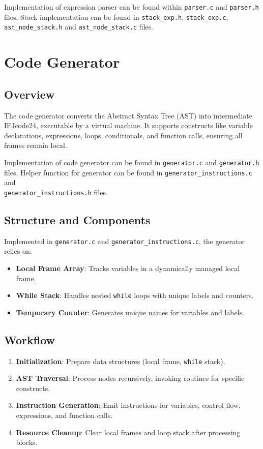 \documentclass[12pt,a4paper]{article}
\begin{document}
Implementation of expression parser can be found within \texttt{parser.c} and \texttt{parser.h} files. Stack implementation can be found in \texttt{stack\_exp.h}, \texttt{stack\_exp.c}, \texttt{ast\_node\_stack.h} and \texttt{ast\_node\_stack.c} files.

\newpage
\section{Code Generator}

\subsection{Overview}
The code generator converts the Abstract Syntax Tree (AST) into intermediate IFJcode24, executable by a virtual machine. It supports constructs like variable declarations, expressions, loops, conditionals, and function calls, ensuring all frames remain local.

Implementation of code generator can be found in \texttt{generator.c} and \texttt{generator.h} files. Helper function for generator can be found in \texttt{generator\_instructions.c} and \\
\texttt{generator\_instructions.h} files.

\subsection{Structure and Components}
Implemented in \texttt{generator.c} and \texttt{generator\_instructions.c}, the generator relies on:
\begin{itemize}
    \item \textbf{Local Frame Array}: Tracks variables in a dynamically managed local frame.
    \item \textbf{While Stack}: Handles nested \texttt{while} loops with unique labels and counters.
    \item \textbf{Temporary Counter}: Generates unique names for variables and labels.
\end{itemize}

\subsection{Workflow}
\begin{enumerate}
    \item \textbf{Initialization}: Prepare data structures (local frame, \texttt{while} stack).
    \item \textbf{AST Traversal}: Process nodes recursively, invoking routines for specific constructs.
    \item \textbf{Instruction Generation}: Emit instructions for variables, control flow, expressions, and function calls.
    \item \textbf{Resource Cleanup}: Clear local frames and loop stack after processing blocks.
\end{enumerate}
\end{document}
